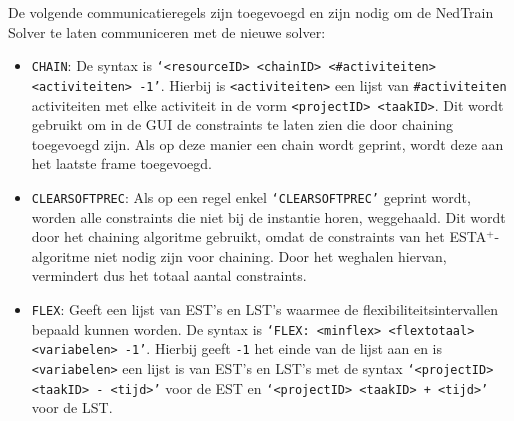 De volgende communicatieregels zijn toegevoegd en zijn nodig om de NedTrain Solver te laten communiceren met de nieuwe solver:
\begin{itemize}
    \item \texttt{CHAIN}: De syntax is \texttt{\textquoteleft <resourceID> <chainID> <\#activiteiten> <activiteiten> -1\textquoteright}. Hierbij is \texttt{<activiteiten>} een lijst van \texttt{\#activiteiten} activiteiten met elke activiteit in de vorm \texttt{<projectID> <taakID>}. Dit wordt gebruikt om in de GUI de constraints te laten zien die door chaining toegevoegd zijn. Als op deze manier een chain wordt geprint, wordt deze aan het laatste frame toegevoegd.
    \item \texttt{CLEARSOFTPREC}: Als op een regel enkel \texttt{\textquoteleft CLEARSOFTPREC\textquoteright} geprint wordt, worden alle constraints die niet bij de instantie horen, weggehaald. Dit wordt door het chaining algoritme gebruikt, omdat de constraints van het ESTA$^+$-algoritme niet nodig zijn voor chaining. Door het weghalen hiervan, vermindert dus het totaal aantal constraints.
    \item \texttt{FLEX}: Geeft een lijst van EST's en LST's waarmee de flexibiliteitsintervallen bepaald kunnen worden. De syntax is \texttt{\textquoteleft FLEX: <minflex> <flextotaal> <variabelen> -1\textquoteright}. Hierbij geeft \texttt{-1} het einde van de lijst aan en is \texttt{<variabelen>} een lijst is van EST's en LST's met de syntax \texttt{\textquoteleft <projectID> <taakID> - <tijd>\textquoteright} voor de EST en \texttt{\textquoteleft <projectID> <taakID> + <tijd>\textquoteright} voor de LST.
\end{itemize}
